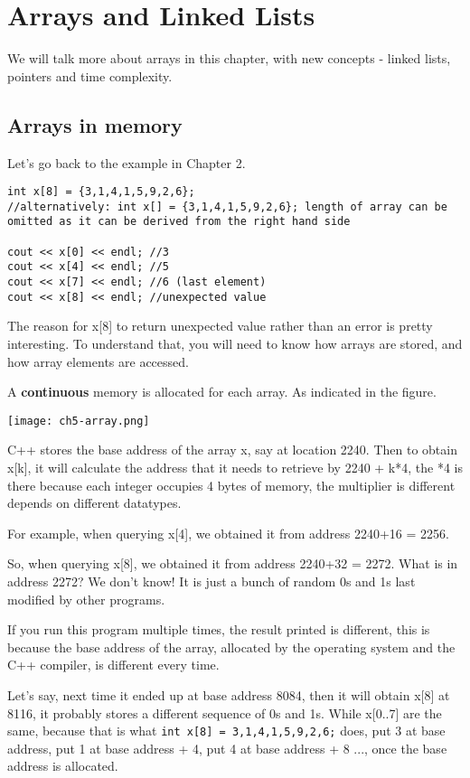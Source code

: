 \chapter{Arrays and Linked Lists}

We will talk more about arrays in this chapter, with new concepts - linked lists, pointers and time complexity.

\section{Arrays in memory}

Let's go back to the example in Chapter 2.

\begin{lstlisting}
int x[8] = {3,1,4,1,5,9,2,6};
//alternatively: int x[] = {3,1,4,1,5,9,2,6}; length of array can be omitted as it can be derived from the right hand side

cout << x[0] << endl; //3 
cout << x[4] << endl; //5
cout << x[7] << endl; //6 (last element)
cout << x[8] << endl; //unexpected value 
\end{lstlisting}

The reason for x[8] to return unexpected value rather than an error is pretty interesting. To understand that, you will need to know how arrays are stored, and how array elements are accessed. 

A \textbf{continuous} memory is allocated for each array. As indicated in the figure.

\texttt{[image: ch5-array.png]}

C++ stores the base address of the array x, say at location 2240. Then to obtain x[k], it will calculate the address that it needs to retrieve by 2240 + k*4, the *4 is there because each integer occupies 4 bytes of memory, the multiplier is different depends on different datatypes. 

For example, when querying x[4], we obtained it from address 2240+16 = 2256. 

So, when querying x[8], we obtained it from address 2240+32 = 2272. What is in address 2272? We don't know! It is just a bunch of random 0s and 1s last modified by other programs. 
\vspace{6mm}

If you run this program multiple times, the result printed is different, this is because the base address of the array, allocated by the operating system and the C++ compiler, is different every time. 

Let's say, next time it ended up at base address 8084, then it will obtain x[8] at 8116, it probably stores a different sequence of 0s and 1s. While x[0..7] are the same, because that is what \texttt{int x[8] = {3,1,4,1,5,9,2,6};} does, put 3 at base address, put 1 at base address + 4, put 4 at base address + 8 ..., once the base address is allocated.

